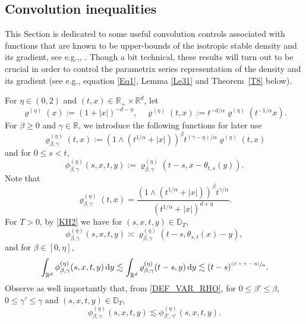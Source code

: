 \documentclass[11pt]{article}
\newcommand{\eg}{e.g.,\xspace}
\numberwithin{equation}{section}\providecommand{\asymp}{\mathrel{\sim}}
\newcommand{\psfrac}[2]{\sfrac{(#1)}{#2}}
\theoremstyle{plain}
\theoremstyle{definition}
\newcommand\mD{\mathbb{D}}
\newcommand\mR{\mathbb{R}}
\newcommand\1{{\mathbf{1}}}
\newcommand{\dif}{\,\mathrm{d}}
\begin{document}
\subsection{Convolution inequalities}
This Section is dedicated to some useful convolution controls associated with functions that are known to be upper-bounds of the isotropic stable density and its gradient, see \eg \cite{kolo:00}, \cite{Bo-Ja}. Though a bit technical, these results will turn out to be crucial in order to control the parametrix series representation of the density and its gradient (see \eg equation \eqref{Eq1}, Lemma \ref{Le31} and Theorem~\ref{T8} below).

For $\eta\in(0,2)$ and $(t,x)\in\mR_+\times\mR^d$, let
\[
\varrho^{(\eta)}(x):=(1+|x|)^{-d-\eta},\quad \varrho^{(\eta)}(t,x):=t^{-d/\alpha}\varrho^{(\eta)}(t^{-1/\alpha}x).
\]
For $\beta\geq 0$ and $\gamma\in\mR$, we introduce the following functions for later use
\begin{equation}\label{DEF_VAR_RHO}
\varrho^{(\eta)}_{\beta,\gamma}(t,x):=(1\wedge (t^{1/\alpha}+|x|))^\beta t^{(\gamma-\eta)/\alpha}\varrho^{(\eta)}(t,x)
\end{equation}
and for $0\leq s<t$,
\begin{equation}
\label{DEF_PHI}
\phi^{(\eta)}_{\beta,\gamma}(s,x,t,y):=\varrho^{(\eta)}_{\beta,\gamma}(t-s,x-\theta_{t,s}(y)).
\end{equation}
Note that
\[
\varrho^{(\eta)}_{\beta,\gamma}(t,x)=\frac{(1\wedge (t^{1/\alpha}+|x|))^\beta t^{\gamma/\alpha}}{(t^{1/\alpha}+|x|)^{d+\eta}}.
\]
For $T>0$, by \eqref{KH2} we have for $(s,x,t,y)\in\mD_T$,
\begin{equation}\label{ES44}
\phi^{(\eta)}_{\beta,\gamma}(s,x,t,y)\asymp \varrho^{(\eta)}_{\beta,\gamma}(t-s,\theta_{s,t}(x)-y),
\end{equation}
and for $\beta\in[0,\eta]$,
\begin{equation}
\int_{\mR^d}\phi^{(\eta)}_{\beta,\gamma}(s,x,t,y)\dif y
\lesssim\int_{\mR^d}\varrho^{(\eta)}_{\beta,\gamma}(t-s,y)\dif y
\lesssim (t-s)^{\psfrac{\beta+\gamma-\eta}{\alpha}}.\label{ES4}
\end{equation}
{Observe as well importantly that, from \eqref{DEF_VAR_RHO}, for $0\le \beta'\le \beta $, $0\le \gamma'\le \gamma $
and $(s,x,t,y)\in\mD_T$,\vspace*{-3pt}
\begin{equation}
\label{DOM_STAB}
\phi^{(\eta)}_{\beta,\gamma}(s,x,t,y)\lesssim \phi^{(\eta)}_{\beta',\gamma'}(s,x,t,y).
\end{equation}
}
\end{document}
